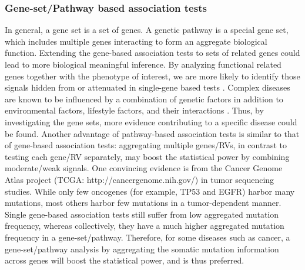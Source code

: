 \documentclass[12pt]{article}
\begin{document}
\subsubsection{Gene-set/Pathway based association tests}\label{sec:bg:Pathway test}
In general, a gene set is a set of genes. A genetic pathway is a special gene set, which includes multiple genes interacting to form an aggregate biological function. Extending the gene-based association tests to sets of related genes could lead to more biological meaningful inference.
By analyzing functional related genes together with the phenotype of interest, we are more likely to identify those signals hidden from or attenuated in single-gene based tests \cite{BloodPressureGenome-WideAssociationStudies2011,Hirschhorn2009,Zhong2010,Wang2010}. Complex diseases are known to be influenced by a combination of genetic factors in addition to environmental factors, lifestyle factors, and their interactions \cite{Hirschhorn2005,McCarthy2008}. Thus, by investigating the gene sets, more evidence contributing to a specific disease could be found. Another advantage of pathway-based association tests is similar to that of gene-based association tests: aggregating multiple genes/RVs, in contrast to testing each gene/RV separately, may boost the statistical power by combining moderate/weak signals. One convincing evidence is from the Cancer Genome Atlas project (TCGA: http://cancergenome.nih.gov/) in tumor sequencing studies. While only few oncogenes (for example, TP53 and EGFR) harbor many mutations, most others harbor few mutations in a tumor-dependent manner. Single gene-based association tests still suffer from low aggregated mutation frequency, whereas collectively, they have a much higher aggregated mutation frequency in a gene-set/pathway. Therefore, for some diseases such as cancer, a gene-set/pathway analysis by aggregating the somatic mutation information across genes will boost the statistical power, and is thus preferred.
\end{document}
